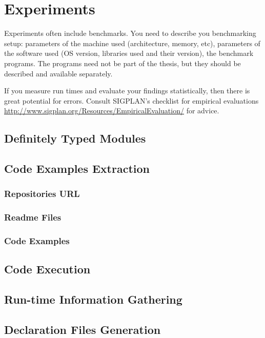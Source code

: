 \chapter{Experiments}\label{chap:experiments}

Experiments often include benchmarks.
You need to describe you benchmarking setup: parameters of the machine used (architecture, memory, etc), parameters of the software used (OS version, libraries used and their version), the benchmark programs.
The programs need not be part of the thesis, but they should be described and available separately.

If you measure run times and evaluate your findings statistically, then there is great potential for errors.
Consult SIGPLAN's checklist for empirical evaluations \url{http://www.sigplan.org/Resources/EmpiricalEvaluation/} for advice. 




\section{Definitely Typed Modules}

\section{Code Examples Extraction}
\subsection{Repositories URL}
\subsection{Readme Files}
\subsection{Code Examples}

\section{Code Execution}

\section{Run-time Information Gathering}

\section{Declaration Files Generation}

